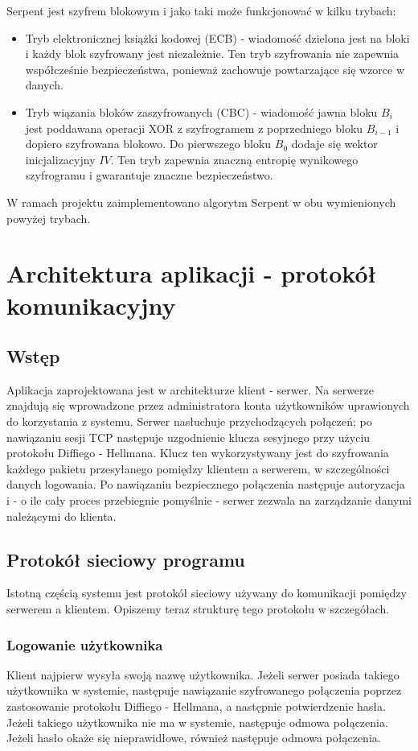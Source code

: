 \documentclass{article}
\begin{document}
	Serpent jest szyfrem blokowym i jako taki może funkcjonować w kilku trybach:
	\begin{itemize}
		\item Tryb elektronicznej książki kodowej (ECB) - wiadomość dzielona jest na bloki i każdy blok szyfrowany jest niezależnie. Ten tryb szyfrowania nie zapewnia współcześnie bezpieczeństwa, ponieważ zachowuje powtarzające się wzorce w danych. 
		\item Tryb wiązania bloków zaszyfrowanych (CBC) - wiadomość jawna bloku $B_i$ jest poddawana operacji XOR z szyfrogramem z poprzedniego bloku $B_{i-1}$ i dopiero szyfrowana blokowo. Do pierwszego bloku $B_0$ dodaje się wektor inicjalizacyjny $IV$. Ten tryb zapewnia znaczną entropię wynikowego szyfrogramu i gwarantuje znaczne bezpieczeństwo. 
	\end{itemize}
	W ramach projektu zaimplementowano algorytm Serpent w obu wymienionych powyżej trybach. 
	
	\section{Architektura aplikacji - protokół komunikacyjny}
	\subsection{Wstęp}
	Aplikacja zaprojektowana jest w architekturze klient - serwer. Na serwerze znajdują się wprowadzone przez administratora konta użytkowników uprawionych do korzystania z systemu. Serwer nasłuchuje przychodzących połączeń; po nawiązaniu sesji TCP następuje uzgodnienie klucza sesyjnego przy użyciu protokołu Diffiego - Hellmana. Klucz ten wykorzystywany jest do szyfrowania każdego pakietu przesyłanego pomiędzy klientem a serwerem, w szczególności danych logowania. Po nawiązaniu bezpiecznego połączenia następuje autoryzacja i - o ile cały proces przebiegnie pomyślnie - serwer zezwala na zarządzanie danymi należącymi do klienta. 
	
	\subsection{Protokół sieciowy programu}
	
	Istotną częścią systemu jest protokół sieciowy używany do komunikacji pomiędzy serwerem a klientem. Opiszemy teraz strukturę tego protokołu w szczegółach. 
	
	\subsubsection{Logowanie użytkownika}
	Klient najpierw wysyła swoją nazwę użytkownika. Jeżeli serwer posiada takiego użytkownika w systemie, następuje nawiązanie szyfrowanego połączenia poprzez zastosowanie protokołu Diffiego - Hellmana, a następnie potwierdzenie hasła. Jeżeli takiego użytkownika nie ma w systemie, następuje odmowa połączenia. Jeżeli hasło okaże się nieprawidłowe, również następuje odmowa połączenia. 
	
\end{document}

